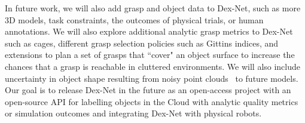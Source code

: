 In future work, we will also add grasp and object data to Dex-Net, such as more 3D models, task constraints, the outcomes of physical trials, or human annotations.
We will also explore additional analytic grasp metrics to Dex-Net such as cages, different grasp selection policies such as Gittins indices, and extensions to plan a set of grasps that ``cover" an object surface to increase the chances that a grasp is reachable in cluttered environments.
We will also include uncertainty in object shape resulting from noisy point clouds~\cite{mahler2015gp} to future models.
Our goal is to release Dex-Net in the future as an open-access project with an open-source API for labelling objects in the Cloud with analytic quality metrics or simulation outcomes and integrating Dex-Net with physical robots.


